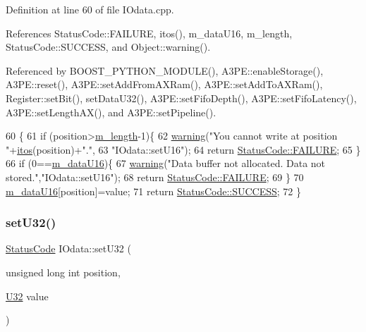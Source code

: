 Definition at line 60 of file I\+Odata.\+cpp.



References Status\+Code\+::\+F\+A\+I\+L\+U\+RE, itos(), m\+\_\+data\+U16, m\+\_\+length, Status\+Code\+::\+S\+U\+C\+C\+E\+SS, and Object\+::warning().



Referenced by B\+O\+O\+S\+T\+\_\+\+P\+Y\+T\+H\+O\+N\+\_\+\+M\+O\+D\+U\+L\+E(), A3\+P\+E\+::enable\+Storage(), A3\+P\+E\+::reset(), A3\+P\+E\+::set\+Add\+From\+A\+X\+Ram(), A3\+P\+E\+::set\+Add\+To\+A\+X\+Ram(), Register\+::set\+Bit(), set\+Data\+U32(), A3\+P\+E\+::set\+Fifo\+Depth(), A3\+P\+E\+::set\+Fifo\+Latency(), A3\+P\+E\+::set\+Length\+A\+X(), and A3\+P\+E\+::set\+Pipeline().


\begin{DoxyCode}
60                                                               \{
61   \textcolor{keywordflow}{if} (position>\hyperlink{classIOdata_afabe57441da019eb614d277799106aac}{m\_length}-1)\{
62     \hyperlink{classObject_a65cd4fda577711660821fd2cd5a3b4c9}{warning}(\textcolor{stringliteral}{"You cannot write at position "}+\hyperlink{Tools_8h_af330027dbdafb9a30768b3613c553e60}{itos}(position)+\textcolor{stringliteral}{"."},
63         \textcolor{stringliteral}{"IOdata::setU16"});
64     \textcolor{keywordflow}{return} \hyperlink{classStatusCode_a6f565cbeadc76d14c72f047e5e85eb4ba3da73d4c469762eb9d3c960368252b26}{StatusCode::FAILURE};
65   \}
66   \textcolor{keywordflow}{if} (0==\hyperlink{classIOdata_a8d698e077b7898009691b9086a3e6453}{m\_dataU16})\{
67     \hyperlink{classObject_a65cd4fda577711660821fd2cd5a3b4c9}{warning}(\textcolor{stringliteral}{"Data buffer not allocated. Data not stored."},\textcolor{stringliteral}{"IOdata::setU16"});
68     \textcolor{keywordflow}{return} \hyperlink{classStatusCode_a6f565cbeadc76d14c72f047e5e85eb4ba3da73d4c469762eb9d3c960368252b26}{StatusCode::FAILURE};
69   \}
70   \hyperlink{classIOdata_a8d698e077b7898009691b9086a3e6453}{m\_dataU16}[position]=value;
71   \textcolor{keywordflow}{return} \hyperlink{classStatusCode_a6f565cbeadc76d14c72f047e5e85eb4badd0da38d3ba0d922efd1f4619bc37ad8}{StatusCode::SUCCESS};
72 \}
\end{DoxyCode}
\mbox{\label{classIOdata_abbed9a057203bc763f97b85fb385f36b}} 
\subsubsection{\texorpdfstring{set\+U32()}{setU32()}}
{\footnotesize\ttfamily \hyperlink{classStatusCode}{Status\+Code} I\+Odata\+::set\+U32 (\begin{DoxyParamCaption}\item[{unsigned long int}]{position,  }\item[{\hyperlink{classIOdata_a96fb57f5fcd87b708743abd3c86a5198}{U32}}]{value }\end{DoxyParamCaption})}



